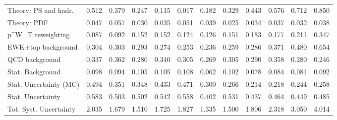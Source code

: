 \begin{tabular}{l|p{0.6cm}p{0.6cm}p{0.6cm}p{0.6cm}p{0.6cm}p{0.6cm}p{0.6cm}p{0.6cm}p{0.6cm}p{0.6cm}p{0.6cm}}
Theory: PS and hadr.                     & 0.512 & 0.379 & 0.247 & 0.115 & 0.017 & 0.182 & 0.329 & 0.443 & 0.576 & 0.712 & 0.850 \\
Theory: PDF                              & 0.047 & 0.057 & 0.030 & 0.035 & 0.051 & 0.039 & 0.025 & 0.034 & 0.037 & 0.032 & 0.038 \\
p^{W}_{T} reweighting                    & 0.087 & 0.092 & 0.152 & 0.152 & 0.124 & 0.126 & 0.151 & 0.183 & 0.177 & 0.211 & 0.347 \\
EWK+top background                       & 0.304 & 0.303 & 0.293 & 0.274 & 0.253 & 0.236 & 0.259 & 0.286 & 0.371 & 0.480 & 0.654 \\
QCD background                           & 0.337 & 0.362 & 0.280 & 0.340 & 0.305 & 0.269 & 0.305 & 0.290 & 0.358 & 0.280 & 0.246 \\
Stat. Background                         & 0.098 & 0.094 & 0.105 & 0.105 & 0.108 & 0.062 & 0.102 & 0.078 & 0.084 & 0.081 & 0.092 \\
Stat. Uncertainty (MC)                   & 0.494 & 0.351 & 0.348 & 0.433 & 0.471 & 0.300 & 0.266 & 0.214 & 0.218 & 0.244 & 0.258 \\
\hline
Stat. Uncertainty                        & 0.583 & 0.503 & 0.502 & 0.542 & 0.558 & 0.402 & 0.531 & 0.437 & 0.464 & 0.449 & 0.485 \\
\hline
Tot. Syst. Uncertainty                   & 2.035 & 1.679 & 1.510 & 1.725 & 1.827 & 1.335 & 1.500 & 1.806 & 2.318 & 3.050 & 4.014 \\
\hline
\end{tabular}
